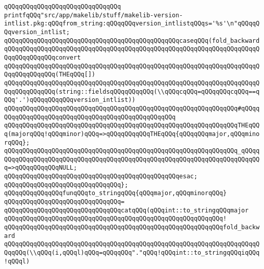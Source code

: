 \verb|qQQqqQQqqQQqqQQqqQQqqQQqqQQqqQQq|\newline
\verb|printfqQQq"src/app/makelib/stuff/makelib-version-intlist.pkg:qQQqfrom_string:qQQqqQQqversion_intlistqQQqs='%s'\n"qQQqqQQqversion_intlist;|\newline
\verb|qQQqqQQqqQQqqQQqqQQqqQQqqQQqqQQqqQQqqQQqqQQqqQQqcaseqQQq(fold_backward|\newline
\verb|qQQqqQQqqQQqqQQqqQQqqQQqqQQqqQQqqQQqqQQqqQQqqQQqqQQqqQQqqQQqqQQqqQQqqQQqqQQqqQQqqQQqconvert|\newline
\verb|qQQqqQQqqQQqqQQqqQQqqQQqqQQqqQQqqQQqqQQqqQQqqQQqqQQqqQQqqQQqqQQqqQQqqQQqqQQqqQQqqQQq(THEqQQq[])|\newline
\verb|qQQqqQQqqQQqqQQqqQQqqQQqqQQqqQQqqQQqqQQqqQQqqQQqqQQqqQQqqQQqqQQqqQQqqQQqqQQqqQQqqQQq(string::fieldsqQQqqQQqqQQq(\\qQQqcqQQq=qQQqqQQqcqQQq==qQQq'.')qQQqqQQqqQQqversion_intlist))|\newline
\verb|qQQqqQQqqQQqqQQqqQQqqQQqqQQqqQQqqQQqqQQqqQQqqQQqqQQqqQQqqQQqqQQq#qQQqqQQqqQQqqQQqqQQqqQQqqQQqqQQqqQQqqQQqqQQqqQQqqQQq|\newline
\verb|qQQqqQQqqQQqqQQqqQQqqQQqqQQqqQQqqQQqqQQqqQQqqQQqqQQqqQQqqQQqqQQqTHEqQQq(majorqQQq!qQQqminor)qQQq=>qQQqqQQqqQQqTHEqQQq{qQQqqQQqmajor,qQQqminorqQQq};|\newline
\verb|qQQqqQQqqQQqqQQqqQQqqQQqqQQqqQQqqQQqqQQqqQQqqQQqqQQqqQQqqQQqqQQq_qQQqqQQqqQQqqQQqqQQqqQQqqQQqqQQqqQQqqQQqqQQqqQQqqQQqqQQqqQQqqQQqqQQqqQQqqQQq=>qQQqqQQqqQQqNULL;|\newline
\verb|qQQqqQQqqQQqqQQqqQQqqQQqqQQqqQQqqQQqqQQqqQQqqQQqesac;|\newline
\verb|qQQqqQQqqQQqqQQqqQQqqQQqqQQqqQQq};|\newline
\newline
\verb|qQQqqQQqqQQqqQQqfunqQQqto_stringqQQq{qQQqmajor,qQQqminorqQQq}|\newline
\verb|qQQqqQQqqQQqqQQqqQQqqQQqqQQqqQQq=|\newline
\verb|qQQqqQQqqQQqqQQqqQQqqQQqqQQqqQQqcatqQQq(qQQqint::to_stringqQQqmajor|\newline
\verb|qQQqqQQqqQQqqQQqqQQqqQQqqQQqqQQqqQQqqQQqqQQqqQQqqQQqqQQqqQQq!|\newline
\verb|qQQqqQQqqQQqqQQqqQQqqQQqqQQqqQQqqQQqqQQqqQQqqQQqqQQqqQQqqQQqfold_backward|\newline
\verb|qQQqqQQqqQQqqQQqqQQqqQQqqQQqqQQqqQQqqQQqqQQqqQQqqQQqqQQqqQQqqQQqqQQqqQQqqQQq(\\qQQq(i,qQQql)qQQq=qQQqqQQq"."qQQq!qQQqint::to_stringqQQqiqQQq!qQQql)|\newline
